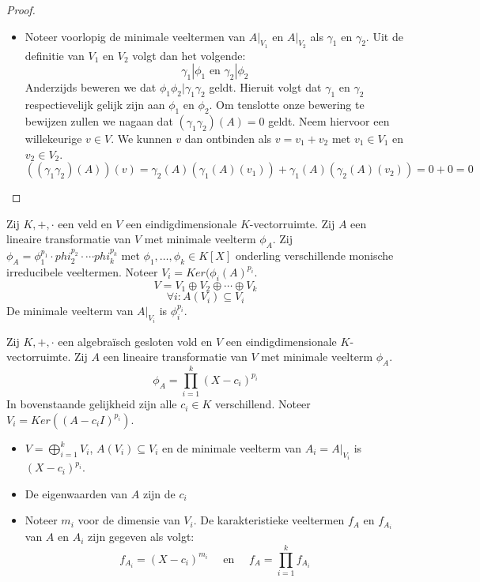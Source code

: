 \documentclass[main.tex]{subfiles}
\begin{document}
\begin{pr}
\begin{proof}
\begin{itemize}
    \item Noteer voorlopig de minimale veeltermen van $A|_{V_{1}}$ en $A|_{V_{2}}$ als $\gamma_{1}$ en $\gamma_{2}$.
      Uit de definitie van $V_{1}$ en $V_{2}$ volgt dan het volgende:
      \[ \gamma_{1}|\phi_{1} \text{ en } \gamma_{2}|\phi_{2} \]
      Anderzijds beweren we dat $\phi_{1}\phi_{2}|\gamma_{1}\gamma_{2}$ geldt.
      Hieruit volgt dat $\gamma_{1}$ en $\gamma_{2}$ respectievelijk gelijk zijn aan $\phi_{1}$ en $\phi_{2}$.
      Om tenslotte onze bewering te bewijzen zullen we nagaan dat $(\gamma_{1}\gamma_{2})(A) = 0$ geldt.
      Neem hiervoor een willekeurige $v\in V$.
      We kunnen $v$ dan ontbinden als $v=v_{1}+v_{2}$ met $v_{1}\in V_{1}$ en $v_{2}\in V_{2}$.
      \[ ((\gamma_{1}\gamma_{2})(A))(v) = \gamma_{2}(A)(\gamma_{1}(A)(v_{1})) + \gamma_{1}(A)(\gamma_{2}(A)(v_{2})) = 0+ 0= 0 \]
    \end{itemize}
  \end{proof}
\end{pr} 

\begin{gev}
  Zij $K,+,\cdot$ een veld en $V$ een eindigdimensionale $K$-vectorruimte.
  Zij $A$ een lineaire transformatie van $V$ met minimale veelterm $\phi_{A}$.
  Zij $\phi_{A} = \phi_{1}^{p_{1}}\cdot phi_{2}^{p_{2}}\cdot \dotsb phi_{k}^{p_{k}}$ met $\phi_{1},\dotsc,\phi_{k}\in K[X]$ onderling verschillende monische irreducibele veeltermen.
  Noteer $V_{i} = Ker(\phi_{i}(A)^{p_{i}}$.
  \[ V = V_{1} \oplus V_{2} \oplus \dotsb \oplus V_{k} \]
  \[ \forall i: A(V_{i}) \subseteq V_{i} \]
  De minimale veelterm van $A|_{V_{i}}$ is $\phi_{i}^{p_{i}}$.
\end{gev}

\begin{st}
  Zij $K,+,\cdot$ een algebra\"isch gesloten vold en $V$ een eindigdimensionale $K$-vectorruimte.
  Zij $A$ een lineaire transformatie van $V$ met minimale veelterm $\phi_{A}$.
  \[ \phi_{A} = \prod_{i=1}^{k}(X-c_{i})^{p_{i}} \]
  In bovenstaande gelijkheid zijn alle $c_{i} \in K$ verschillend.
  Noteer $V_{i}=Ker((A-c_{i}I)^{p_{i}})$.
  \begin{itemize}
  \item $V = \bigoplus_{i=1}^{k}V_{i}$, $A(V_{i}) \subseteq V_{i}$ en de minimale veelterm van $A_{i} = A|_{V_{i}}$ is $(X-c_{i})^{p_{i}}$.
  \item De eigenwaarden van $A$ zijn de $c_{i}$
  \item Noteer $m_{i}$ voor de dimensie van $V_{i}$.
    De karakteristieke veeltermen $f_{A}$ en $f_{A_{i}}$ van $A$ en $A_{i}$ zijn gegeven als volgt:
    \[ f_{A_{i}} = (X-c_{i})^{m_{i}} \quad\text{ en }\quad f_{A} = \prod_{i=1}^{k}f_{A_{i}} \]
  \end{itemize}
\end{st}
\end{document}
